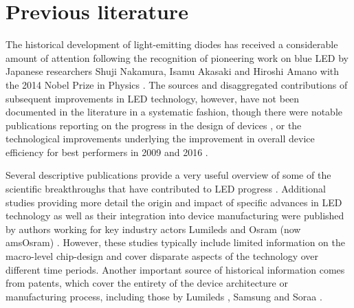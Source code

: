 \documentclass[twoside,twocolumn,9pt]{article}
\begin{document}
\section{Previous literature}

The historical development of light-emitting diodes has received a considerable amount of attention following the recognition of pioneering work on blue LED by Japanese researchers Shuji Nakamura, Isamu Akasaki and Hiroshi Amano with the 2014 Nobel Prize in Physics \cite{Akasaki2015}\cite{Nakamura2015}. The sources and disaggregated contributions of subsequent improvements in LED technology, however, have not been documented in the literature in a systematic fashion, though there were notable publications reporting on the progress in the design of devices \cite{Shchekin2006}\cite{krames2007led}\cite{laubsch2009high}\cite{hahn2014development}, or the technological improvements  underlying the improvement in overall device efficiency for best performers in 2009 \cite{tsao2010solid} and 2016 \cite{pattison2017solid}. 

Several descriptive publications provide a very useful overview of some of the scientific breakthroughs  that have contributed to LED progress \cite{krames2007status}\cite{Phillips2007}\cite{Bierhuizen2007}\cite{Nakamura2013}\cite{feezell2018invention}\cite{Taki2019} . Additional  studies providing more detail the origin and impact of specific advances in LED technology as well as their integration into device manufacturing were published by authors working for key industry actors Lumileds\cite{MuellerMach2005}\cite{Shchekin2006}\cite{lumi2015lumi}\cite{Bhardwaj2017} and Osram (now amsOsram) \cite{Haerle2004}\cite{Baur2009}\cite{laubsch2009high}\cite{hahn2014development}. However, these studies typically include limited information on the macro-level chip-design and cover disparate aspects of the technology over different time periods. Another important source of historical information comes from patents, which cover the entirety of the device architecture or manufacturing process, including those by Lumileds \cite{margalith2011thin}, Samsung \cite{jung2014phos} \cite{cha2019semiconductor} and Soraa \cite{cich2017high}.
\end{document}
